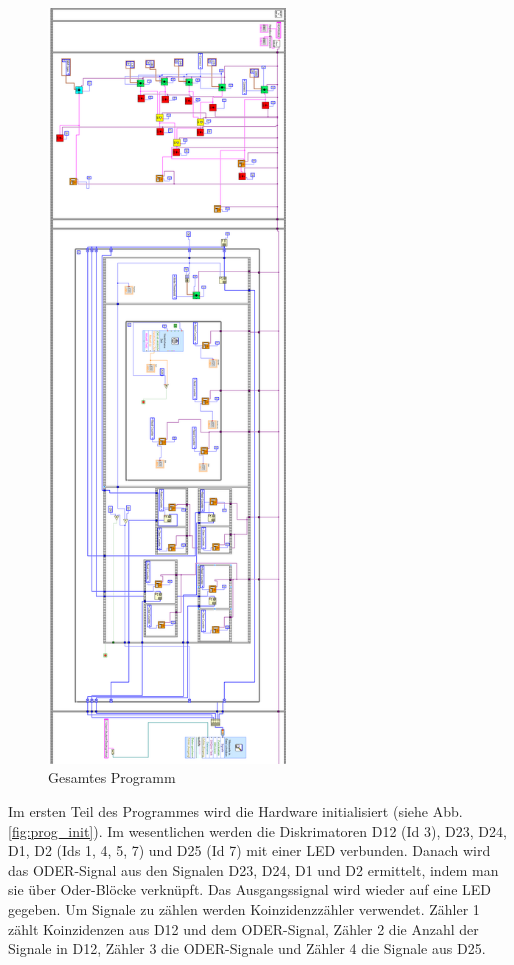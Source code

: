 \begin{figure}
\centering
\includegraphics[height=20cm]{data/friedrich/prog_ges_rot.png}
\caption{Gesamtes Programm}
\label{fig:prog_all}
\end{figure}

Im ersten Teil des Programmes wird die Hardware initialisiert (siehe Abb. \ref{fig:prog_init}). Im wesentlichen werden die Diskrimatoren D12 (Id 3), D23, D24, D1, D2 (Ids 1, 4, 5, 7) und D25 (Id 7) mit einer LED verbunden. Danach wird das ODER-Signal aus den Signalen D23, D24, D1 und D2 ermittelt, indem man sie über Oder-Blöcke verknüpft. Das Ausgangssignal wird wieder auf eine LED gegeben. Um Signale zu zählen werden Koinzidenzzähler verwendet. Zähler 1 zählt Koinzidenzen aus D12 und dem ODER-Signal, Zähler 2 die Anzahl der Signale in D12, Zähler 3 die ODER-Signale und Zähler 4 die Signale aus D25. \\
 
